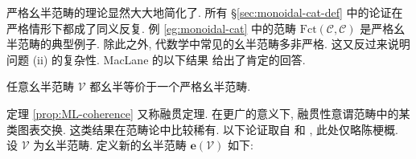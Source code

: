 严格幺半范畴的理论显然大大地简化了. 所有 \S\ref{sec:monoidal-cat-def} 中的论证在严格情形下都成了同义反复. 例 \ref{eg:monoidal-cat} 中的范畴 $\text{Fct}(\mathcal{C}, \mathcal{C})$ 是严格幺半范畴的典型例子. 除此之外, 代数学中常见的幺半范畴多非严格. 这又反过来说明问题 (ii) 的复杂性. MacLane 的以下结果 \cite[VII.2]{ML98} 给出了肯定的回答.

\begin{theorem}[S.\ MacLane]\label{prop:ML-coherence}
	任意幺半范畴 $\mathcal{V}$ 都幺半等价于一个严格幺半范畴.
\end{theorem}

定理 \ref{prop:ML-coherence} 又称融贯定理. 在更广的意义下, 融贯性意谓范畴中的某类图表交换. 这类结果在范畴论中比较稀有. 以下论证取自 \cite[pp.26--27]{JS93} 和 \cite[\S 2.8]{EGNO15}, 此处仅略陈梗概. 设 $\mathcal{V}$ 为幺半范畴. 定义新的幺半范畴 $\mathbf{e}(\mathcal{V})$ 如下:
